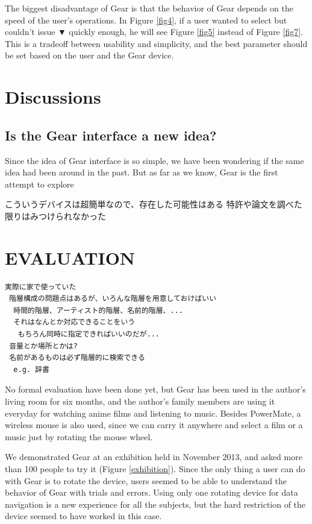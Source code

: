 \documentclass{article}
\def\down{▼}
\begin{document}
The biggest disadvantage of Gear is that
the behavior of Gear depends on the speed of the user's operations.
In Figure \ref{fig4},
if a user wanted to select  but couldn't issue {\down}
quickly enough, he will see Figure \ref{fig5} instead of Figure \ref{fig7}.
This is a tradeoff between usability and simplicity, and
the best parameter should be set based on the user and the Gear device.

\section{Discussions}

\subsection{Is the Gear interface a new idea?}
  Since the idea of Gear interface is so simple, we have been wondering if the same idea had been around in the past.
  But as far as we know, Gear is the first attempt to explore 

 こういうデバイスは超簡単なので、存在した可能性はある
 特許や論文を調べた限りはみつけられなかった

\section*{EVALUATION}

\begin{verbatim}
実際に家で使っていた
 階層構成の問題点はあるが、いろんな階層を用意しておけばいい
  時間的階層、アーティスト的階層、名前的階層、...
  それはなんとか対応できることをいう
   もちろん同時に指定できればいいのだが...
 音量とか場所とかは?
 名前があるものは必ず階層的に検索できる
  e.g. 辞書
\end{verbatim}

No formal evaluation have been done yet, but Gear has been used in the author's
living room for six months, and the author's family members are using it
everyday for watching anime films and listening to music.
Besides PowerMate, a wireless mouse is also used,
since we can carry it anywhere and select
a film or a music just by rotating the mouse wheel.

We demonstrated Gear at an exhibition
held in November 2013, and asked more than 100 people to try it
(Figure \ref{exhibition}).
%
Since the only thing a user can do with Gear is to rotate the device,
users seemed to be able to understand the behavior of Gear with trials and errors.
% 
% 
Using only one rotating device for data navigation is a new experience for
all the subjects, but the hard restriction of the device seemed to have worked in this case.
\end{document}
